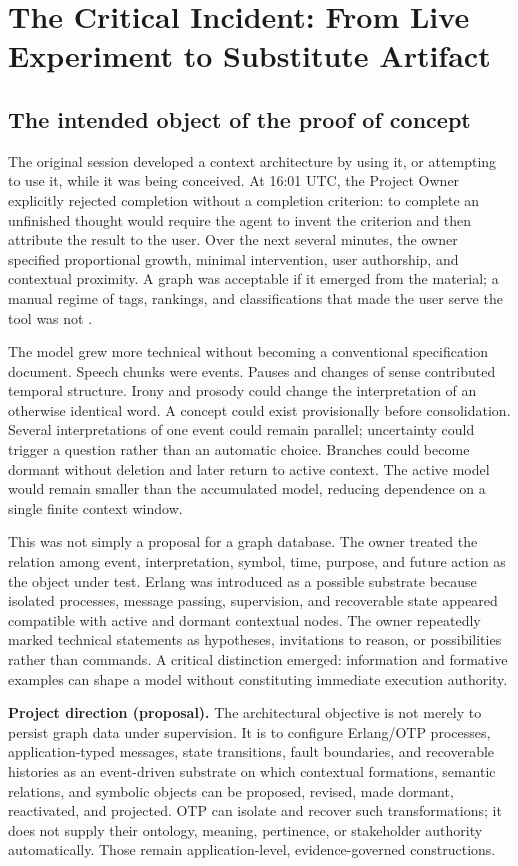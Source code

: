 \documentclass[10pt,a4paper]{article}
\begin{document}
\section{The Critical Incident: From Live Experiment to Substitute Artifact}

\subsection{The intended object of the proof of concept}

The original session developed a context architecture by using it, or attempting to use it, while it was being conceived. At 16:01 UTC, the Project Owner explicitly rejected completion without a completion criterion: to complete an unfinished thought would require the agent to invent the criterion and then attribute the result to the user. Over the next several minutes, the owner specified proportional growth, minimal intervention, user authorship, and contextual proximity. A graph was acceptable if it emerged from the material; a manual regime of tags, rankings, and classifications that made the user serve the tool was not \cite{sessionrecord}.

The model grew more technical without becoming a conventional specification document. Speech chunks were events. Pauses and changes of sense contributed temporal structure. Irony and prosody could change the interpretation of an otherwise identical word. A concept could exist provisionally before consolidation. Several interpretations of one event could remain parallel; uncertainty could trigger a question rather than an automatic choice. Branches could become dormant without deletion and later return to active context. The active model would remain smaller than the accumulated model, reducing dependence on a single finite context window.

This was not simply a proposal for a graph database. The owner treated the relation among event, interpretation, symbol, time, purpose, and future action as the object under test. Erlang was introduced as a possible substrate because isolated processes, message passing, supervision, and recoverable state appeared compatible with active and dormant contextual nodes. The owner repeatedly marked technical statements as hypotheses, invitations to reason, or possibilities rather than commands. A critical distinction emerged: information and formative examples can shape a model without constituting immediate execution authority.

\noindent\textbf{Project direction (proposal).} The architectural objective is not merely to persist graph data under supervision. It is to configure Erlang/OTP processes, application-typed messages, state transitions, fault boundaries, and recoverable histories as an event-driven substrate on which contextual formations, semantic relations, and symbolic objects can be proposed, revised, made dormant, reactivated, and projected. OTP can isolate and recover such transformations; it does not supply their ontology, meaning, pertinence, or stakeholder authority automatically. Those remain application-level, evidence-governed constructions.
\end{document}
